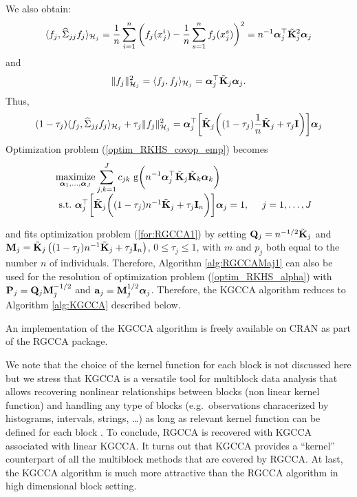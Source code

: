 \documentclass[
]{jss}
\begin{document}
We also obtain: \begin{equation} \langle f_j, \widehat{\Sigma}_{jj}f_j
\rangle_{\mathcal{H}_j} =
\frac{1}{n}\sum_{i=1}^n\bigg(f_j(x_j^i)-\frac{1}{n}\sum_{s=1}^n
f_j(x_j^s) \bigg)^2 = n^{-1}\boldsymbol{\alpha}_j^\top\tilde{\mathbf{K}}_j^2\boldsymbol{\alpha}_j
\end{equation} and
\begin{equation} \Vert f_j \Vert^2_{\mathcal{H}_j} = \langle f_j,
f_j\rangle_{\mathcal{H}_j} = \boldsymbol{\alpha}_j^\top\tilde{\mathbf{K}}_j\boldsymbol{\alpha}_j.
\end{equation} Thus,
\begin{equation} (1-\tau_j)\langle f_j, \widehat{\Sigma}_{jj}f_j
\rangle_{\mathcal{H}_j} + \tau_j \Vert f_j
\Vert_{\mathcal{H}_j}^2=\boldsymbol{\alpha}_j^\top\bigg[\tilde{\mathbf{K}}_j\bigg((1-\tau_j)\frac{1}{n}\tilde{\mathbf{K}}_j+
\tau_j \mathbf{I}\bigg)\bigg]\boldsymbol{\alpha}_j
\end{equation} Optimization problem (\ref{optim_RKHS_covop_emp}) becomes
\begin{equation}
\begin{array}{ll} 
&\underset{\boldsymbol \alpha_1, \ldots, \boldsymbol
\alpha_J }{\text{maximize}} \displaystyle \sum_{j, k = 1}^J c_{jk} \text{ g}
\bigg(n^{-1}\boldsymbol\alpha_j^\top\tilde{\mathbf{K}}_j\tilde{\mathbf{K}}_k\boldsymbol\alpha_k\bigg)\\
&\mathrm{~s.t.~}
\boldsymbol\alpha_j^\top\bigg[\tilde{\mathbf{K}}_j\bigg((1-\tau_j)n^{-1}\tilde{\mathbf{K}}_j+
\tau_j \mathbf{I}_n\bigg)\bigg]\boldsymbol\alpha_j=1, \text{~~~~} j =1, \ldots,
J 
\end{array}
\label{optim_RKHS_alpha}
\end{equation}

and fits optimization problem (\ref{for:RGCCA1}) by setting
\(\mathbf{Q}_j = n^{-1/2}\tilde{\mathbf{K}}_j\) and
\(\mathbf{M}_j = \tilde{\mathbf{K}}_j\left((1-\tau_j)n^{-1}\tilde{\mathbf{K}}_j+ \tau_j \mathbf{I}_n\right)\),
\(0 \leq \tau_j \leq 1\), with \(m\) and \(p_j\) both equal to the
number \(n\) of individuals. Therefore, Algorithm \ref{alg:RGCCAMaj1}
can also be used for the resolution of optimization problem
(\ref{optim_RKHS_alpha}) with \(\mathbf{P}_j = \mathbf{Q}_j \mathbf{M}_j^{-1/2}\) and
\(\mathbf{a}_j = \mathbf{M}_j^{1/2}\boldsymbol \alpha_j\). Therefore, the KGCCA
algorithm reduces to Algorithm \ref{alg:KGCCA} described below.

An implementation of the KGCCA algorithm is freely available on CRAN as
part of the RGCCA package.

We note that the choice of the kernel function for each block is not
discussed here but we stress that KGCCA is a versatile tool for
multiblock data analysis that allows recovering nonlinear relationships
between blocks (non linear kernel function) and handling any type of
blocks (e.g.~observations characerized by histograms, intervals,
strings, \ldots) as long as relevant kernel function can be defined for
each block \citep{Vert03,Yamanishi04}. To conclude, RGCCA is recovered
with KGCCA associated with linear KGCCA. It turns out that KGCCA
provides a ``kernel'' counterpart of all the multiblock methods that are
covered by RGCCA. At last, the KGCCA algorithm is much more attractive
than the RGCCA algorithm in high dimensional block setting.
\end{document}
